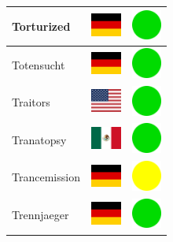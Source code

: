 \documentclass[12pt, a4paper, twoside]{report}
\begin{document}
\begin{center}
\begin{longtable}{|p{5cm}|p{2cm}|p{2cm}|}
Torturized & \includegraphics[width=1cm]{4x3/de} & \includegraphics[width=1cm]{likes/y} \\ \hline
Totensucht & \includegraphics[width=1cm]{4x3/de} & \includegraphics[width=1cm]{likes/y} \\ \hline
Traitors & \includegraphics[width=1cm]{4x3/us} & \includegraphics[width=1cm]{likes/y} \\ \hline
Tranatopsy & \includegraphics[width=1cm]{4x3/mx} & \includegraphics[width=1cm]{likes/y} \\ \hline
Trancemission & \includegraphics[width=1cm]{4x3/de} & \includegraphics[width=1cm]{likes/m} \\ \hline
Trennjaeger & \includegraphics[width=1cm]{4x3/de} & \includegraphics[width=1cm]{likes/y} \\ \hline

\end{longtable}
\end{center}
\end{document}
